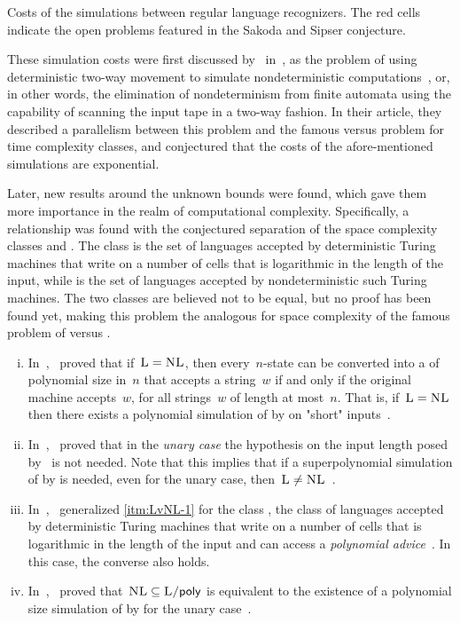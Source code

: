 \begin{table}
	\centering
	\caption[Costs of the simulations between regular language recognizers.]{Costs of the simulations between regular language recognizers.
		The red cells indicate the open problems featured in the Sakoda and Sipser conjecture.}
	\label{tab:sims-core-general-context}
\end{table}

These simulation costs were first discussed by~\citeauthor{SakSip78} in~\citeyear{SakSip78}, as the problem of using deterministic two-way movement to simulate nondeterministic computations~\cite{SakSip78}, or, in other words, the elimination of nondeterminism from finite automata using the capability of scanning the input tape in a two-way fashion.
In their article, they described a parallelism between this problem and the famous \cP versus \cNP problem for time complexity classes, and conjectured that the costs of the afore-mentioned simulations are exponential.

Later, new results around the unknown bounds were found, which gave them more importance in the realm of computational complexity.
Specifically, a relationship was found with the conjectured separation of the space complexity classes \cL and \cNL.
The class \cL is the set of languages accepted by deterministic Turing machines that write on a number of cells that is logarithmic in the length of the input, while \cNL is the set of languages accepted by nondeterministic such Turing machines.
The two classes are believed not to be equal, but no proof has been found yet, making this problem the analogous for space complexity of the famous problem of \cP versus \cNP.
\begin{enumerate}[(i)]
	\item\label{itm:LvNL-1} In~\citeyear{BerLin77},~\citeauthor{BerLin77} proved that if~$\textsc{L}=\textsc{NL}$, then every~$n$-state \TNFA can be converted into a \TDFA of polynomial size in~$n$ that accepts a string~$w$ if and only if the original machine accepts~$w$, for all strings~$w$ of length at most~$n$.
	      That is, if~$\textsc{L}=\textsc{NL}$ then there exists a polynomial simulation of \TNFAs by \TDFAs on "short" inputs~\cite{BerLin77}.
	\item In~\citeyear{GefPig11},~\citeauthor{GefPig11} proved that in the \emph{unary case} the hypothesis on the input length posed by~\citeauthor{BerLin77} is not needed.
	      Note that this implies that if a superpolynomial simulation of \TNFAs by \TDFAs is needed, even for the unary case, then~$\textsc{L}\ne\textsc{NL}$~\cite{GefPig11}.
	\item In~\citeyear{Kap14},~\citeauthor{Kap14} generalized \ref{itm:LvNL-1} for the class \cPolyL, the class of languages accepted by deterministic Turing machines that write on a number of cells that is logarithmic in the length of the input and can access a \emph{polynomial advice}~\cite{Kap14,KarLip82}. In this case, the converse also holds.
	\item In~\citeyear{KapPig12},~\citeauthor{KapPig12} proved that~$\textsc{NL}\subseteq\textsc{L/\ensuremath{\mathsf{poly}}}$ is equivalent to the existence of a polynomial size simulation of \TNFAs by \TDFAs for the unary case~\cite{KapPig15}.
\end{enumerate}

